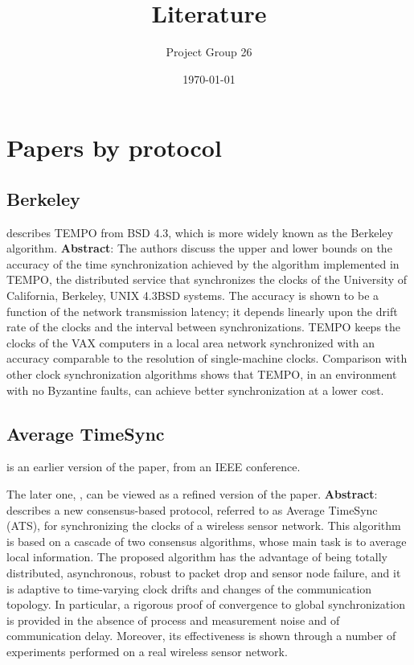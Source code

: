 \documentclass[11pt]{article}
\title{Literature}
\author{Project Group 26}
\date{\today}
\begin{document}
\section{Papers by protocol}

\subsection{Berkeley}
\cite{Gusella89} describes TEMPO from BSD 4.3, which is more widely known as the Berkeley algorithm.
\textbf{Abstract}:
The authors discuss the upper and lower bounds on the accuracy of the time synchronization achieved by the algorithm implemented in TEMPO, the distributed service that synchronizes the clocks of the University of California, Berkeley, UNIX 4.3BSD systems. The accuracy is shown to be a function of the network transmission latency; it depends linearly upon the drift rate of the clocks and the interval between synchronizations. TEMPO keeps the clocks of the VAX computers in a local area network synchronized with an accuracy comparable to the resolution of single-machine clocks. Comparison with other clock synchronization algorithms shows that TEMPO, in an environment with no Byzantine faults, can achieve better synchronization at a lower cost.

\subsection{Average TimeSync}
\cite{SchenatoGamba2007} is an earlier version of the paper, from an IEEE conference.  

The later one, \cite{LucaFiorentin2011}, can be viewed as a refined version of the paper.  \textbf{Abstract}: describes a new consensus-based protocol, referred to as Average TimeSync (ATS), for
synchronizing the clocks of a wireless sensor network. This algorithm is based on a cascade of two
consensus algorithms, whose main task is to average local information. The proposed algorithm has the
advantage of being totally distributed, asynchronous, robust to packet drop and sensor node failure, and
it is adaptive to time-varying clock drifts and changes of the communication topology. In particular,
a rigorous proof of convergence to global synchronization is provided in the absence of process and
measurement noise and of communication delay. Moreover, its effectiveness is shown through a number
of experiments performed on a real wireless sensor network.

\nocite{*}
\printbibliography
\end{document}

